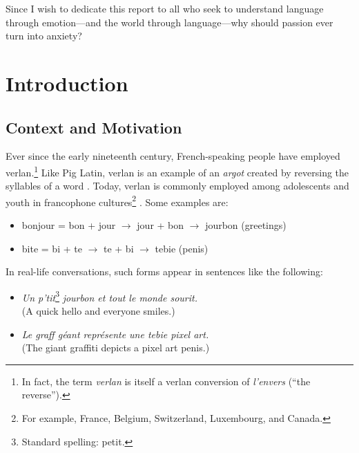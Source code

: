 \documentclass[12pt]{article}
\begin{document}
Since I wish to dedicate this report to all who seek to understand language through emotion\;---\;and the world through language\;---\;why should passion ever turn into anxiety?



\newpage
\section{Introduction}
\subsection{Context and Motivation}

Ever since the early nineteenth century, French-speaking people have employed verlan.\footnote{In fact, the term \textit{verlan} is itself a verlan conversion of \textit{l'envers} (``the reverse'').} 
Like Pig Latin, verlan is an example of an \textit{argot} created by reversing the syllables of a word \cite{rajabov2025,bach2018}. Today, verlan is commonly employed among adolescents and youth in francophone cultures\footnote{For example, France, Belgium, Switzerland, Luxembourg, and Canada.} \cite{evolutionverlan}. Some examples are:

\begin{flushleft}
\small
\begin{itemize}
  \item bonjour = bon + jour \(\rightarrow\) jour + bon \(\rightarrow\) jourbon (greetings)
  \item bite = bi + te \(\rightarrow\) te + bi \(\rightarrow\) tebie (penis)
\end{itemize}
\end{flushleft}

\noindent In real-life conversations, such forms appear in sentences like the following:

\begin{flushleft}
\small
\begin{itemize}
  \item \textit{Un p'tit}\footnote{Standard spelling: petit.}\textit{ jourbon et tout le monde sourit.}\\(A quick hello and everyone smiles.)
  \item \textit{Le graff géant représente une tebie pixel art.}\\(The giant graffiti depicts a pixel art penis.)
\end{itemize}
\end{flushleft}
\end{document}
